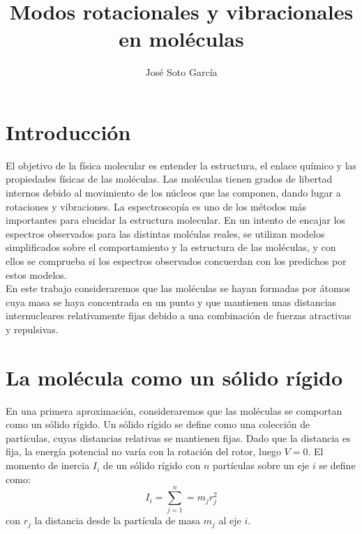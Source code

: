\documentclass[a4paper]{article}
\title{Modos rotacionales y vibracionales en moléculas}
\author{José Soto García}
\begin{document}
\maketitle
\newpage
\tableofcontents
\newpage
\nocite{haken2013}
\nocite{levine1980}
\nocite{marion2013}
\nocite{wilson1980}
\nocite{buendia}

\section{Introducción}
El objetivo de la física molecular es entender la estructura, el enlace químico y las propiedades físicas de las moléculas. Las moléculas tienen grados de libertad internos debido al movimiento de los núcleos que las componen, dando lugar a rotaciones y vibraciones. La espectroscopía es uno de los métodos más importantes para elucidar la estructura molecular. En un intento de encajar los espectros observados para las distintas molćulas reales, se utilizan modelos simplificados sobre el comportamiento y la estructura de las moléculas, y con ellos se comprueba si los espectros observados concuerdan con los predichos por estos modelos.\\

En este trabajo consideraremos que las moléculas se hayan formadas por átomos cuya masa se haya concentrada en un punto y que mantienen unas distancias internucleares relativamente fijas debido a una combinación de fuerzas atractivas y repulsivas.

\section{La molécula como un sólido rígido}
En una primera aproximación, consideraremos que las moléculas se comportan como un sólido rígido. Un sólido rígido se define como una colección de partículas, cuyas distancias relativas se mantienen fijas. Dado que la distancia es fija, la energía potencial no varía con la rotación del rotor, luego $V=0$. El momento de inercia $I_i$ de un sólido rígido con $n$ partículas sobre un eje $i$ se define como:
\begin{equation}
I_i= \sum_{j=1}^n=m_jr_j^2
\end{equation}
con $r_j$ la distancia desde la partícula de masa $m_j$ al eje $i$.
\end{document}
